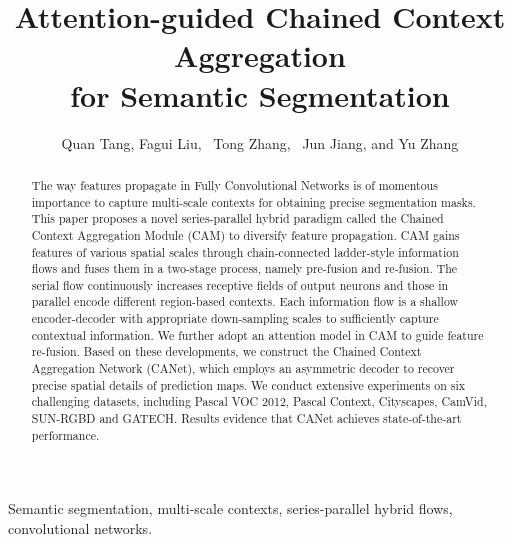 \documentclass[journal]{IEEEtran}
\begin{document}
\title{Attention-guided Chained Context Aggregation\\for Semantic Segmentation}




\author{Quan Tang,
        Fagui Liu,~
        Tong Zhang,~
        Jun Jiang,
        and Yu Zhang}



















\maketitle

\begin{abstract}
The way features propagate in Fully Convolutional Networks is of momentous importance to capture multi-scale contexts for obtaining precise segmentation masks. This paper proposes a novel series-parallel hybrid paradigm called the Chained Context Aggregation Module (CAM) to diversify feature propagation. CAM gains features of various spatial scales through chain-connected ladder-style information flows and fuses them in a two-stage process, namely pre-fusion and re-fusion. The serial flow continuously increases receptive fields of output neurons and those in parallel encode different region-based contexts. Each information flow is a shallow encoder-decoder with appropriate down-sampling scales to sufficiently capture contextual information. We further adopt an attention model in CAM  to guide feature re-fusion. Based on these developments, we construct the Chained Context Aggregation Network (CANet), which employs an asymmetric decoder to recover precise spatial details of prediction maps. We conduct extensive experiments on six challenging datasets, including Pascal VOC 2012, Pascal Context, Cityscapes, CamVid, SUN-RGBD and GATECH. Results evidence that CANet achieves state-of-the-art performance.
\end{abstract}

\begin{IEEEkeywords}
Semantic segmentation, multi-scale contexts, series-parallel hybrid flows, convolutional networks.
\end{IEEEkeywords}
\end{document}
